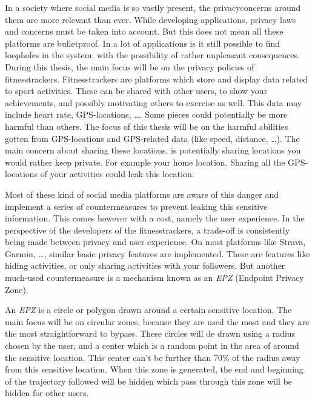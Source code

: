 In a society where social media is so vastly present, the privacyconcerns
around them are more relevant than ever. While developing applications, privacy
laws and concerns must be taken into account. But this does not mean all these
platforms are bulletproof. In a lot of applications is it still possible to
find loopholes in the system, with the possibility of rather unpleasant
consequences. During this thesis, the main focus will be on the privacy
policies of fitnesstrackers. Fitnesstrackers are platforms which store and
display data related to sport activities. These can be shared with other users,
to show your achievements, and possibly motivating others to exercise as well.
This data may include heart rate, GPS-locations, \ldots. Some pieces could
potentially be more harmful than others. The focus of this thesis will be on
the harmful abilities gotten from GPS-locations and GPS-related data (like
speed, distance, \ldots). The main concern about sharing these locations, is
potentially sharing locations you would rather keep private. For example your
home location. Sharing all the GPS-locations of your activities could leak this
location.

Most of these kind of social media platforms are aware of this danger and
implement a series of countermeasures to prevent leaking this sensitive
information. This comes however with a cost, namely the user experience. In the
perspective of the developers of the fitnesstrackers, a trade-off is
consistently being made between privacy and user experience. On most platforms
like Strava, Garmin, \ldots, similar basic privacy features are implemented.
These are features like hiding activities, or only sharing activities with your
followers. But another much-used countermeasure is a mechanism known as an
\textit{EPZ} (Endpoint Privacy Zone).

An \textit{EPZ} is a circle or polygon drawn around a certain sensitive
location. The main focus will be on circular zones, because they are used the
most and they are the most straightforward to bypass. These circles will de
drawn using a radius chosen by the user, and a center which is a random point
in the area of around the sensitive location. This center can't be further than
70\% of the radius away from this sensitive location. When this zone is
generated, the end and beginning of the trajectory followed will be hidden
which pass through this zone will be hidden for other users.

